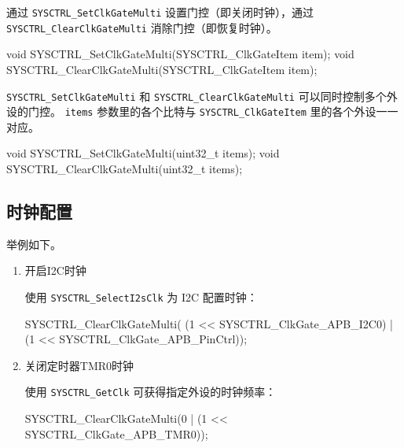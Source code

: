 \documentclass[
  12pt,
]{book}
\newenvironment{Shaded}{\begin{snugshade}}{\end{snugshade}}
\newcommand{\DataTypeTok}[1]{\textcolor[rgb]{0.13,0.29,0.53}{#1}}
\newcommand{\DecValTok}[1]{\textcolor[rgb]{0.00,0.00,0.81}{#1}}
\newcommand{\NormalTok}[1]{#1}
\begin{document}
通过 \texttt{SYSCTRL\_SetClkGateMulti} 设置门控（即关闭时钟），通过 \texttt{SYSCTRL\_ClearClkGateMulti} 消除门控（即恢复时钟）。

\begin{Shaded}
\begin{Highlighting}[]
\DataTypeTok{void}\NormalTok{ SYSCTRL_SetClkGateMulti(SYSCTRL_ClkGateItem item);}
\DataTypeTok{void}\NormalTok{ SYSCTRL_ClearClkGateMulti(SYSCTRL_ClkGateItem item);}
\end{Highlighting}
\end{Shaded}

\texttt{SYSCTRL\_SetClkGateMulti} 和 \texttt{SYSCTRL\_ClearClkGateMulti} 可以同时控制多个外设的门控。 \texttt{items} 参数里的各个比特与 \texttt{SYSCTRL\_ClkGateItem} 里的各个外设一一对应。

\begin{Shaded}
\begin{Highlighting}[]
\DataTypeTok{void}\NormalTok{ SYSCTRL_SetClkGateMulti(}\DataTypeTok{uint32_t}\NormalTok{ items);}
\DataTypeTok{void}\NormalTok{ SYSCTRL_ClearClkGateMulti(}\DataTypeTok{uint32_t}\NormalTok{ items);}
\end{Highlighting}
\end{Shaded}

\hypertarget{ux65f6ux949fux914dux7f6e}{%
\subsection{时钟配置}\label{ux65f6ux949fux914dux7f6e}}

举例如下。

\begin{enumerate}
\def\labelenumi{\arabic{enumi}.}
\item
  开启I2C时钟

  使用 \texttt{SYSCTRL\_SelectI2sClk} 为 I2C 配置时钟：

\begin{Shaded}
\begin{Highlighting}[]
\NormalTok{SYSCTRL_ClearClkGateMulti( (}\DecValTok{1}\NormalTok{ << SYSCTRL_ClkGate_APB_I2C0)}
\NormalTok{                          |(}\DecValTok{1}\NormalTok{ << SYSCTRL_ClkGate_APB_PinCtrl));}
\end{Highlighting}
\end{Shaded}
\item
  关闭定时器TMR0时钟

  使用 \texttt{SYSCTRL\_GetClk} 可获得指定外设的时钟频率：

\begin{Shaded}
\begin{Highlighting}[]
\NormalTok{SYSCTRL_ClearClkGateMulti(}\DecValTok{0}
\NormalTok{                        | (}\DecValTok{1}\NormalTok{ << SYSCTRL_ClkGate_APB_TMR0));}
\end{Highlighting}
\end{Shaded}
\end{enumerate}
\end{document}
